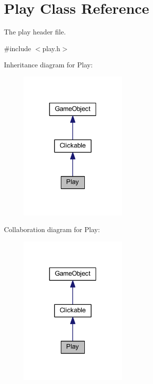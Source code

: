 \hypertarget{class_play}{\section{Play Class Reference}
\label{class_play}
}


The play header file.  




{\ttfamily \#include $<$play.\+h$>$}



Inheritance diagram for Play\+:\nopagebreak
\begin{figure}[H]
\begin{center}
\leavevmode
\includegraphics[width=151pt]{class_play__inherit__graph}
\end{center}
\end{figure}


Collaboration diagram for Play\+:\nopagebreak
\begin{figure}[H]
\begin{center}
\leavevmode
\includegraphics[width=151pt]{class_play__coll__graph}
\end{center}
\end{figure}
